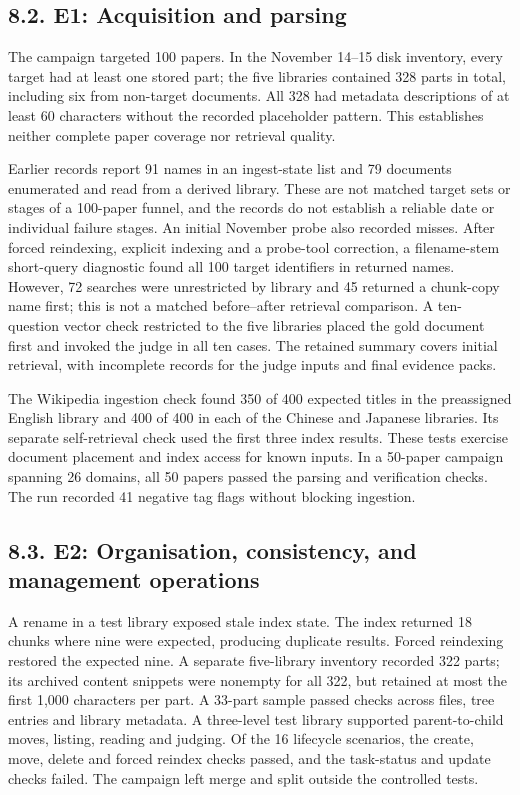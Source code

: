 \subsection{8.2. E1: Acquisition and parsing}

The campaign targeted 100 papers. In the November 14--15 disk inventory,
every target had at least one stored part; the five libraries contained 328
parts in total, including six from non-target documents. All 328 had
metadata descriptions of at least 60 characters without the recorded
placeholder pattern. This establishes neither complete paper coverage nor
retrieval quality.

Earlier records report 91 names in an ingest-state list and 79 documents
enumerated and read from a derived library. These are not matched target
sets or stages of a 100-paper funnel, and the records do not establish a
reliable date or individual failure stages. An initial November probe also
recorded misses. After forced reindexing, explicit indexing and a probe-tool
correction, a filename-stem short-query diagnostic found all 100 target
identifiers in returned names. However, 72 searches were unrestricted by
library and 45 returned a chunk-copy name first; this is not a matched
before--after retrieval comparison. A ten-question vector check restricted to
the five libraries placed the gold document first and invoked the judge in
all ten cases. The retained summary covers initial retrieval, with
incomplete records for the judge inputs and final evidence packs.

The Wikipedia ingestion check found 350 of 400 expected titles in the
preassigned English library and 400 of 400 in each of the Chinese and
Japanese libraries. Its separate self-retrieval check used the first
three index results. These tests exercise document placement and
index access for known inputs. In a 50-paper campaign spanning 26
domains, all 50 papers passed the parsing and verification checks.
The run recorded 41 negative tag flags without blocking ingestion.

\subsection{8.3. E2: Organisation, consistency, and management operations}

A rename in a test library exposed stale index state. The index returned
18 chunks where nine were expected, producing duplicate results. Forced
reindexing restored the expected nine. A separate five-library inventory
recorded 322 parts; its archived content snippets were nonempty for all
322, but retained at most the first 1,000 characters per part. A 33-part
sample passed checks across files, tree entries and
library metadata. A three-level
test library supported parent-to-child moves, listing, reading and
judging. Of the 16 lifecycle scenarios, the create, move, delete and
forced reindex checks passed, and the task-status and update checks
failed. The campaign left merge and split outside the controlled tests.


